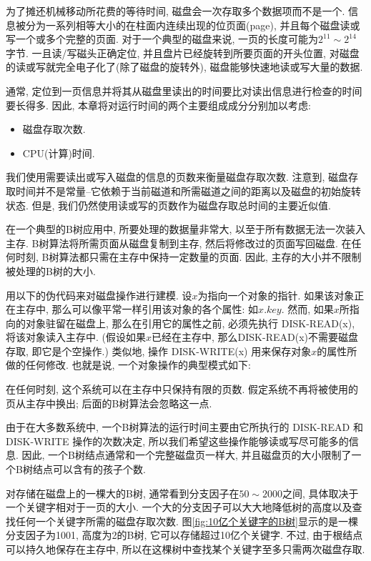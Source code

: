\documentclass[oneside,10pt,fontset=none]{ctexbook}
\numberwithin{definition}{chapter}
\numberwithin{theorem}{chapter}
\numberwithin{lemma}{chapter}
\begin{document}
为了摊还机械移动所花费的等待时间, 磁盘会一次存取多个数据项而不是一个. 信息被分为一系列相等大小的在柱面内连续出现的位页面(page), 并且每个磁盘读或写一个或多个完整的页面. 对于一个典型的磁盘来说, 一页的长度可能为$2^{11}\sim 2^{14}$字节. 一且读/写磁头正确定位, 并且盘片已经旋转到所要页面的开头位置, 对磁盘的读或写就完全电子化了(除了磁盘的旋转外), 磁盘能够快速地读或写大量的数据.

通常, 定位到一页信息并将其从磁盘里读出的时间要比对读出信息进行检查的时间要长得多. 因此, 本章将对运行时间的两个主要组成成分分别加以考虑:

\begin{itemize}
    \item 磁盘存取次数.
    \item CPU(计算)时间.
\end{itemize}

我们使用需要读出或写入磁盘的信息的页数来衡量磁盘存取次数. 注意到, 磁盘存取时间并不是常量--它依赖于当前磁道和所需磁道之间的距离以及磁盘的初始旋转状态. 但是, 我们仍然使用读或写的页数作为磁盘存取总时间的主要近似值.

在一个典型的B树应用中, 所要处理的数据量非常大, 以至于所有数据无法一次装入主存. B树算法将所需页面从磁盘复制到主存, 然后将修改过的页面写回磁盘. 在任何时刻, B树算法都只需在主存中保持一定数量的页面. 因此, 主存的大小并不限制被处理的B树的大小.

用以下的伪代码来对磁盘操作进行建模. 设$x$为指向一个对象的指针. 如果该对象正在主存中, 那么可以像平常一样引用该对象的各个属性: 如$x.key$. 然而, 如果$x$所指向的对象驻留在磁盘上, 那么在引用它的属性之前, 必须先执行 DISK-READ(x), 将该对象读入主存中. (假设如果$x$已经在主存中, 那么DISK-READ(x)不需要磁盘存取, 即它是个空操作.) 类似地, 操作 DISK-WRITE(x) 用来保存对象$x$的属性所做的任何修改. 也就是说, 一个对象操作的典型模式如下:



在任何时刻, 这个系统可以在主存中只保持有限的页数. 假定系统不再将被使用的页从主存中换出; 后面的B树算法会忽略这一点.

由于在大多数系统中, 一个B树算法的运行时间主要由它所执行的 DISK-READ 和 DISK-WRITE 操作的次数决定, 所以我们希望这些操作能够读或写尽可能多的信息. 因此, 一个B树结点通常和一个完整磁盘页一样大, 并且磁盘页的大小限制了一个B树结点可以含有的孩子个数.

对存储在磁盘上的一棵大的B树, 通常看到分支因子在$50\sim 2000$之间, 具体取决于一个关键字相对于一页的大小. 一个大的分支因子可以大大地降低树的高度以及查找任何一个关键字所需的磁盘存取次数. 图\ref{fig:10亿个关键字的B树}显示的是一棵分支因子为1001, 高度为2的B树, 它可以存储超过10亿个关键字. 不过, 由于根结点可以持久地保存在主存中, 所以在这棵树中查找某个关键字至多只需两次磁盘存取.
\end{document}
